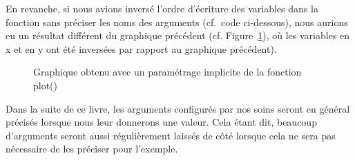 \documentclass[
  letterpaper,
]{book}
\newenvironment{Shaded}{\begin{snugshade}}{\end{snugshade}}
\newcommand{\FunctionTok}[1]{\textcolor[rgb]{0.28,0.35,0.67}{#1}}
\newcommand{\NormalTok}[1]{\textcolor[rgb]{0.00,0.23,0.31}{#1}}
\newcommand{\SpecialCharTok}[1]{\textcolor[rgb]{0.37,0.37,0.37}{#1}}
\begin{document}
\begin{Shaded}
\end{Shaded}

En revanche, si nous avions inversé l'ordre d'écriture des variables
dans la fonction sans préciser les noms des arguments (cf.~code
ci-dessous), nous aurions eu un résultat différent du graphique
précédent (cf. Figure~\ref{fig-plot_function5}), où les variables en x
et en y ont été inversées par rapport au graphique précédent).

\begin{Shaded}
\end{Shaded}

\begin{figure}[H]


\caption{\label{fig-plot_function5}Graphique obtenu avec un paramétrage
implicite de la fonction plot()}

\end{figure}%

Dans la suite de ce livre, les arguments configurés par nos soins seront
en général précisés lorsque nous leur donnerons une valeur. Cela étant
dit, beaucoup d'arguments seront aussi régulièrement laissés de côté
lorsque cela ne sera pas nécessaire de les préciser pour l'exemple.
\end{document}
